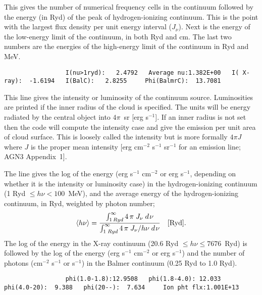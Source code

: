 This gives the number of numerical frequency cells in the continuum
followed by the energy (in Ryd) of the peak of hydrogen-ionizing
continuum.
This is the point with the largest flux density per unit energy interval
($J_\nu$).
Next is the energy of the low-energy limit of the continuum, in both
Ryd and cm.
The last two numbers are the energies of the high-energy limit
of the continuum in Ryd and MeV.
{\setverbatimfontsize{\tiny}
\begin{verbatim}
                 I(nu>1ryd):   2.4792   Average nu:1.382E+00   I( X-ray):  -1.6194   I(BalC):   2.8255     Phi(BalmrC):  13.7081
\end{verbatim}
}

This line gives the intensity or luminosity of the continuum source.
Luminosities are printed if the inner radius of the cloud is specified.
The units will be energy radiated by the central object into
$4\pi$~sr [erg s$^{-1}$].
If an inner radius is not set then the code will compute the intensity
case and give the emission per unit area of cloud surface.
This is loosely
called the intensity but is more formally $4\pi J$ where $J$ is the proper mean
intensity [erg cm$^{-2}$ s$^{-1}$ sr$^{-1}$ for an emission line; AGN3
Appendix~1].

The line gives the log of the energy (erg s$^{-1}$ cm$^{-2}$
or erg s$^{-1}$, depending
on whether it is the intensity or luminosity case) in the hydrogen-ionizing
continuum (1 Ryd $\le h\nu < 100$~MeV), and the average energy of the
hydrogen-ionizing continuum, in Ryd, weighted by photon number;
\begin{equation}
\left\langle {h\nu } \right\rangle  = \frac{{\int_{1\,Ryd}^\infty  {4\,\pi
\;{J_\nu }\;d{\kern 1pt} \nu } }}{{\int_{1\;Ryd}^\infty  {4\,\pi \;{J_\nu
}/h\nu \;d{\kern 1pt} \nu } }}\quad [\mathrm{Ryd}] .%
\end{equation}
The log of the energy in the X-ray continuum (20.6 Ryd $\le h\nu\le  7676$~Ryd) is
followed by the log of the energy (erg s$^{-1}$ cm$^{-2}$ or erg s$^{-1}$) and the number
of photons (cm$^{-2}$ s$^{-1}$ or s$^{-1}$) in the Balmer continuum (0.25 Ryd to 1.0 Ryd).
{\setverbatimfontsize{\tiny}
\begin{verbatim}
                 phi(1.0-1.8):12.9508   phi(1.8-4.0): 12.033   phi(4.0-20):  9.388   phi(20--):  7.634     Ion pht flx:1.001E+13
\end{verbatim}
}

